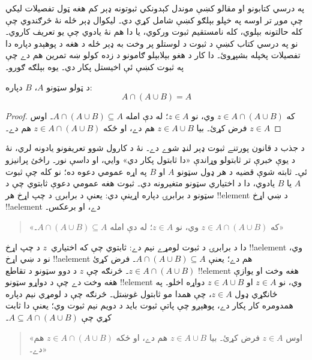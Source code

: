 \documentclass[../../../include/open-logic-section]{subfiles}
\begin{document}

په درسي کتابونو او مقالو کښې موندل کېدونکي ثبوتونه ډېر کم هغه
ټول تفصيلات ليکي چې موږ تر اوسه په خپلو بېلګو کښې شامل کړي دي۔
ليکوال ډېر ځله نۀ څرګندوي چې کله حالتونه بېلوي، کله نامستقيم
ثبوت ورکوي، يا دا هم نۀ يادوي چې يو تعريف کاروي۔ نو په درسي
کتاب کښې د ثبوت د لوستلو پر وخت به ډېر ځله د هغه د پوهېدو
دپاره دا تفصيلات پخپله بشپړوئ۔ دا کار د هغو بېلابېلو ګامونو
د زده کولو ښه تمرين هم دے چې په ثبوت کښې ئې اخيستل پکار دي۔
يوه بېلګه ګورو۔

\begin{prop}[جذب]
د ټولو سټونو $A$، $B$ دپاره:
\[
A \cap (A \cup B) = A
\]
\end{prop}

\begin{proof}
که $z \in A \cap (A \cup B)$ وي، نو $z \in A$؛ له دې امله
$A \cap (A \cup B)
\subseteq A$۔ اوس $z \in A$ فرض کړئ۔ بيا $z \in A \cup B$ هم
دے، او ځکه $z \in A \cap (A \cup B)$ هم دے۔
\end{proof}

د جذب د قانون پورتنے ثبوت ډېر لنډ شوے دے۔ نۀ د کارول شوو
تعريفونو يادونه لري، نۀ د يوې خبرې تر ثابتولو وړاندې «دا
ثابتول پکار دي» وايي، او داسې نور۔ راځئ پرانيزو ئې۔ ثابته
شوې قضيه د هر ډول سټونو $A$ او $B$ په اړه عمومي دعوه ده؛
نو کله چې ثبوت $A$ يا $B$ يادوي، دا د اختياري سټونو متغيرونه
دي۔ ثبوت هغه عمومي دعوې ثابتوي چې د سټونو د برابرۍ دپاره
اړينې دي: يعنې د برابرۍ د چپ اړخ هر !!{element} د ښي اړخ
!!a{element} دے، او برعکس۔

\begin{quote}
«که $z \in A \cap (A \cup B)$ وي، نو $z \in A$؛ له دې امله
  $A \cap (A \cup B)
  \subseteq A$۔»
\end{quote}

دا د برابرۍ د ثبوت لومړے نيم دے: ثابتوي چې که اختياري~$z$
د چپ اړخ !!a{element} وي، نو د ښي اړخ !!a{element} هم دے؛
يعنې $A \cap (A \cup B) \subseteq A$۔ فرض کړئ
$z \in A \cap (A \cup B)$۔ څرنګه چې $z$ د دوو سټونو د تقاطع
!!{element} هغه وخت او يوازې هغه وخت دے چې د دواړو سټونو
!!{element} وي، نو $z \in A$ او $z \in A \cup B$ دواړه اخلو۔
په ځانګړي ډول $z \in A$، چې همدا مو ثابتول غوښتل۔ څرنګه چې
د لومړي نيم دپاره همدومره کار پکار دے، پوهېږو چې پاتې ثبوت
بايد د دويم نيم ثبوت وي؛ يعنې دا ثابت کړي چې
$A \subseteq A \cap
(A \cup B)$۔

\begin{quote}
«اوس $z \in A$ فرض کړئ۔ بيا $z \in A \cup B$ هم دے،
او ځکه $z \in A \cap (A \cup B)$ هم دے۔»
\end{quote}
\end{document}
